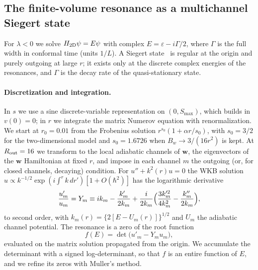 \subsection{The finite-volume resonance as a multichannel Siegert state}
\label{sec:rb-siegert}

For $\lambda<0$ we solve $H_{\rm 2D}\psi=E\psi$ with complex $E=\varepsilon-i\Gamma/2$, where $\Gamma$ is the full width in conformal time (units $1/L$).
A Siegert state~\cite{Siegert:1939zz} is regular at the origin and purely outgoing at large $r$; it exists only at the discrete complex energies of the resonances, and $\Gamma$ is the decay rate of the quasi-stationary state.

\paragraph{Discretization and integration.}
In $s$ we use a sine discrete-variable representation on $(0,S_{\max})$, which builds in $v(0)=0$; in $r$ we integrate the matrix Numerov equation with renormalization.
We start at $r_0=0.01$ from the Frobenius solution $r^{s_0}(1+\alpha r/s_0)$, with $s_0=3/2$ for the two-dimensional model and $s_0=1.6726$ when $B_w\to3/(16r^2)$ is kept. %
At $R_{\rm out}=16$ we transform to the local adiabatic channels of $\bm w$, the eigenvectors of the $\bm w$ Hamiltonian at fixed $r$, and impose in each channel $m$ the outgoing (or, for closed channels, decaying) condition. %
For $u''+k^2(r)u=0$ the WKB solution $u\propto k^{-1/2}\exp(i\int^rk\,dr')[1+O(\hbar^2)]$ has the logarithmic derivative
\begin{equation}
\frac{u_m'}{u_m}=Y_m\equiv ik_m-\frac{k_m'}{2k_m}+\frac{i}{2k_m}\Bigl(\frac{3k_m'^2}{4k_m^2}-\frac{k_m''}{2k_m}\Bigr),
\label{eq:rb-siegert}
\end{equation}
to second order, with $k_m(r)=\{2[E-U_m(r)]\}^{1/2}$ and $U_m$ the adiabatic channel potential.
The resonance is a zero of the root function
\begin{equation}
f(E)=\det\bigl(u'_m-Y_mu_m\bigr),
\label{eq:rb-rootfn}
\end{equation}
evaluated on the matrix solution propagated from the origin.
We accumulate the determinant with a signed log-determinant, so that $f$ is an entire function of $E$, and we refine its zeros with Muller's method.

